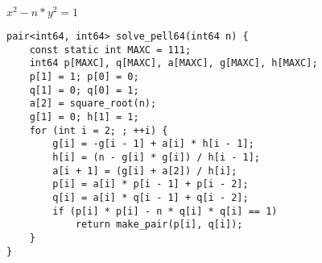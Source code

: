 $x^2-n*y^2=1$
\begin{lstlisting}
pair<int64, int64> solve_pell64(int64 n) {
	const static int MAXC = 111;
	int64 p[MAXC], q[MAXC], a[MAXC], g[MAXC], h[MAXC];
	p[1] = 1; p[0] = 0;
	q[1] = 0; q[0] = 1;
	a[2] = square_root(n);
	g[1] = 0; h[1] = 1;
	for (int i = 2; ; ++i) {
		g[i] = -g[i - 1] + a[i] * h[i - 1];
		h[i] = (n - g[i] * g[i]) / h[i - 1];
		a[i + 1] = (g[i] + a[2]) / h[i];
		p[i] = a[i] * p[i - 1] + p[i - 2];
		q[i] = a[i] * q[i - 1] + q[i - 2];
		if (p[i] * p[i] - n * q[i] * q[i] == 1)
			return make_pair(p[i], q[i]);
	}
}
\end{lstlisting}
